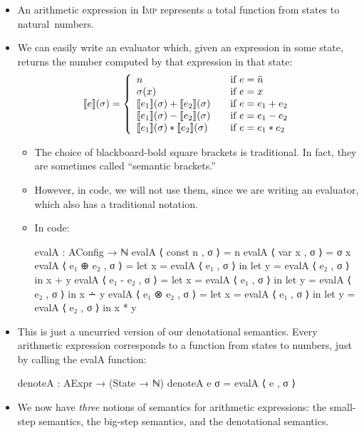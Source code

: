 \documentclass{lecturenotes}
\newcommand{\Imp}{\textsc{Imp}\xspace}
\begin{document}
\begin{itemize}
\item An arithmetic expression in \Imp represents a total function from states to natural~numbers.
\item We can easily write an evaluator which, given an expression in some state, returns the number computed by that expression in that state:
  $$
  \llbracket e \rrbracket (\sigma) =
  \left\{\begin{array}{l@{\hspace{2em}\text{if~}}l}
    n & e = \tilde{n}\\
    \sigma(x) & e = x\\
    \llbracket e_1 \rrbracket(\sigma) + \llbracket e_2 \rrbracket(\sigma) & e = e_1 + e_2\\
    \llbracket e_1 \rrbracket(\sigma) - \llbracket e_2 \rrbracket(\sigma) & e = e_1 - e_2\\
    \llbracket e_1 \rrbracket(\sigma) \ast \llbracket e_2 \rrbracket(\sigma) & e = e_1 \ast e_2\\
  \end{array}\right.
  $$
  \begin{itemize}
  \item The choice of blackboard-bold square brackets is traditional.
    In fact, they are sometimes called ``semantic brackets.''
  \item However, in code, we will not use them, since we are writing an evaluator, which also has a traditional notation.
  \item In code:
\begin{code}
evalA : AConfig → ℕ
evalA ⟨ const n , σ ⟩ = n
evalA ⟨ var x , σ ⟩ = σ x
evalA ⟨ e₁ ⊕ e₂ , σ ⟩ = let x = evalA ⟨ e₁ , σ ⟩ in let y = evalA ⟨ e₂ , σ ⟩ in x + y 
evalA ⟨ e₁ - e₂ , σ ⟩ = let x = evalA ⟨ e₁ , σ ⟩ in let y = evalA ⟨ e₂ , σ ⟩ in x ∸ y 
evalA ⟨ e₁ ⊗ e₂ , σ ⟩ = let x = evalA ⟨ e₁ , σ ⟩ in let y = evalA ⟨ e₂ , σ ⟩ in x * y    
\end{code}
  \end{itemize}
\item This is just a uncurried version of our denotational semantics.
  Every arithmetic expression corresponds to a function from states to numbers, just by calling the \textsf{evalA} function:
\begin{code}
denoteA : AExpr → (State → ℕ)
denoteA e σ = evalA ⟨ e , σ ⟩     
\end{code}
\item We now have \emph{three} notions of semantics for arithmetic expressions: the small-step semantics, the big-step semantics, and the denotational semantics.

\end{itemize}
\end{document}
